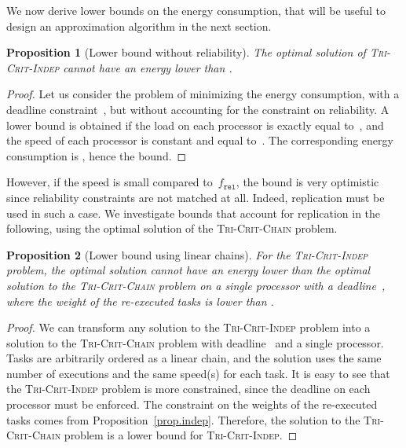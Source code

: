 \documentclass[a4paper]{article}
\theoremstyle{plain}
\newtheorem{proposition}{Proposition}
\theoremstyle{definition}
\theoremstyle{remark}
\newcommand{\fr}{\ensuremath{f_{\texttt{rel}}}\xspace}
\newcommand{\chain}{\textsc{Tri-Crit-Chain}\xspace}
\newcommand{\indep}{\textsc{Tri-Crit-In\-dep}\xspace}
\begin{document}
\medskip

We now derive lower bounds on the energy consumption, that will be
useful to design an approximation algorithm in the next section. 



\begin{proposition}[Lower bound without reliability]
 \label{bound.lp}
The optimal solution of \indep cannot have an energy lower than
 .
\end{proposition}

\begin{proof}
Let us consider the problem of minimizing the energy consumption, with
a deadline constraint~, but without accounting for the constraint
on reliability. A lower bound is obtained if the load on each
processor is exactly equal to~, and the speed of each
processor is constant and equal to~. The corresponding
energy consumption is , hence
the bound. 
\end{proof}

However, if the speed  is small compared to~\fr,
the bound is very optimistic since reliability constraints are not
matched at all. Indeed, replication must be used in such a case. 
We investigate bounds that account for replication in the following,
using the optimal solution of the \chain problem. 





\begin{proposition}[Lower bound using linear chains]
    \label{bound.chain.improved}
    For the \indep problem, the optimal solution cannot have an energy
    lower than the optimal solution to the \chain problem on a single
    processor with a deadline~, where the weight of the
    re-executed tasks is lower than .
\end{proposition}

\begin{proof}
  We can transform any solution to the \indep problem into a solution
  to the \chain problem with deadline~ and a single
  processor. Tasks are arbitrarily ordered as a linear chain, and the
  solution uses the same number of executions and the same speed(s)
  for each task. It is easy to see that the \indep problem is more
  constrained, since the deadline on each processor must be enforced. 
  The constraint on the weights of the re-executed tasks comes from
  Proposition~\ref{prop.indep}. Therefore, the solution to the \chain
  problem is a lower bound for \indep. 
\end{proof}
\end{document}
